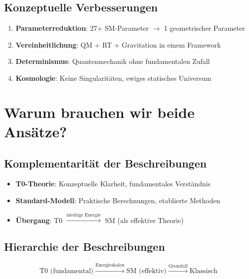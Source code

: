 	\subsection{Konzeptuelle Verbesserungen}
	
	\begin{enumerate}
		\item \textbf{Parameterreduktion}: 27+ SM-Parameter $\to$ 1 geometrischer Parameter
		\item \textbf{Vereinheitlichung}: QM + RT + Gravitation in einem Framework
		\item \textbf{Determinismus}: Quantenmechanik ohne fundamentalen Zufall
		\item \textbf{Kosmologie}: Keine Singularitäten, ewiges statisches Universum
	\end{enumerate}
	
	\section{Warum brauchen wir beide Ansätze?}
	
	\subsection{Komplementarität der Beschreibungen}
	
	\begin{tcolorbox}[colback=yellow!5!white,colframe=yellow!75!black,title=Fundamentale Komplementarität]
		\begin{itemize}
			\item \textbf{T0-Theorie}: Konzeptuelle Klarheit, fundamentales Verständnis
			\item \textbf{Standard-Modell}: Praktische Berechnungen, etablierte Methoden
			\item \textbf{Übergang}: T0 $\xrightarrow{\text{niedrige Energie}}$ SM (als effektive Theorie)
		\end{itemize}
	\end{tcolorbox}
	
	\subsection{Hierarchie der Beschreibungen}
	
	\begin{equation}
		\text{T0 (fundamental)} \xrightarrow{\text{Energieskalen}} \text{SM (effektiv)} \xrightarrow{\text{Grenzfall}} \text{Klassisch}
	\end{equation}
	
